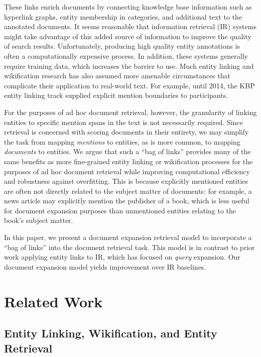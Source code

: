 \documentclass{sig-alternate}
\begin{document}
These links enrich documents by connecting knowledge base information such as hyperlink graphs, entity membership in categories, and additional text to the annotated documents. It seems reasonable that information retrieval (IR) systems might take advantage of this added source of information to improve the quality of search results. Unfortunately, producing high quality entity annotations is often a computationally expensive process. In addition, these systems generally require training data, which increases the barrier to use. Much entity linking and wikification research has also assumed more amenable circumstances that complicate their application to real-world text. For example, until 2014, the KBP entity linking track supplied explicit mention boundaries to participants.

For the purposes of ad hoc document retrieval, however, the granularity of linking entities to specific mention spans in the text is not necessarily required. Since retrieval is concerned with scoring documents in their entirety, we may simplify the task from mapping \textit{mentions} to entities, as is more common, to mapping \textit{documents} to entities. We argue that such a ``bag of links'' provides many of the same benefits as more fine-grained entity linking or wikification processes for the purposes of ad hoc document retrieval while improving computational efficiency and robustness against overfitting. This is because explicitly mentioned entities are often not directly related to the subject matter of documents: for example, a news article may explicitly mention the publisher of a book, which is less useful for document expansion purposes than unmentioned entities relating to the book's subject matter.

In this paper, we present a document expansion retrieval model to incorporate a ``bag of links'' into the document retrieval task. This model is in contrast to prior work applying entity links to IR, which has focused on \textit{query} expansion. Our document expansion model yields improvement over IR baselines.

\section{Related Work}\label{section.related}

\subsection{Entity Linking, Wikification, and Entity Retrieval}\label{section.related.entities}
\end{document}
